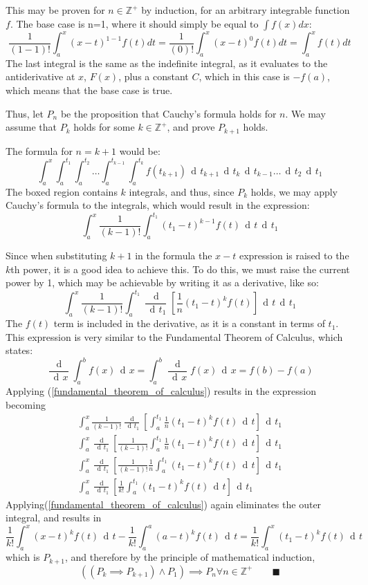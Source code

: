 \documentclass{article}
\DeclareMathOperator{\di}{\,d\!}
\begin{document}
This may be proven for $n \in \mathbb{Z}^+$ by induction, for an arbitrary
integrable function $f$. The base case is n=1, where it should simply be equal
to
$\int
f\left(x\right)dx$:
$$
\frac{1}{(1-1)!}\int_a^x\left(x-t\right)^{1-1}f\left(t\right)dt =
\frac{1}{(0)!}\int_a^x\left(x-t\right)^{0}f\left(t\right)dt =
\int_a^xf\left(t\right)dt
$$
The last integral is the same as the indefinite integral, as it evaluates to
the antiderivative at $x$, $F(x)$, plus a constant $C$, which in this case is
$-f(a)$, which means that the base case is true.

Thus, let $P_n$ be the proposition that Cauchy's formula holds for $n$. We may
assume that $P_k$ holds for some $k \in \mathbb{Z}^+$, and prove $P_{k+1}$
holds.

The formula for $n = k + 1$ would be:
$$
\int_a^x
\boxed{
\int_a^{t_1}
\int_a^{t_2}
\ldots
\int_a^{t_{k-1}}
\int_a^{t_k}f\left(t_{k+1}\right) \di t_{k+1}\di t_k\di t_{k-1} \ldots \di t_2}\di t_1
$$
The boxed region contains $k$ integrals, and thus, since $P_k$ holds, we may apply
Cauchy's formula to the integrals, which would result in the expression:
$$
\int_a^x
\frac{1}{(k-1)!}\int_a^{t_1}\left(t_1-t\right)^{k-1}f\left(t\right)\di t\di t_1
$$

Since when substituting $k+1$ in the formula the $x-t$ expression is raised to
the $k$th power, it is a good idea to achieve this. To do this, we must raise
the current power by 1, which may be achievable by writing it as a derivative,
like so:
$$
\int_a^x
\frac{1}{(k-1)!}\int_a^{t_1}\frac{\di}{\di t_1}\left[\frac{1}{n}\left(t_1-t\right)^k f\left(t\right)\right]\di t\di t_1
$$
The $f(t)$ term is included in the derivative, as it is a constant in terms of
$t_1$. This expression is very similar to the Fundamental Theorem of Calculus,
which states:
\begin{equation}
	\label{fundamental_theorem_of_calculus}
\frac{\di}{\di x}\int_a^bf(x)\di x = \int_a^b\frac{\di}{\di x}f(x) \di x = f(b)- f(a)
\end{equation}
Applying (\ref{fundamental_theorem_of_calculus}) results in the expression becoming
\begin{gather*}
\int_a^x
\frac{1}{(k-1)!}\frac{\di}{\di t_1}\left[\int_a^{t_1}\frac{1}{n}\left(t_1-t\right)^k f(t)\di t\right]\di t_1 \\
\int_a^x
\frac{\di}{\di t_1}\left[\frac{1}{(k-1)!}\int_a^{t_1}\frac{1}{n}\left(t_1-t\right)^k f(t)\di t\right]\di t_1 \\
\int_a^x
\frac{\di}{\di t_1}\left[\frac{1}{(k-1)!}\frac{1}{n}\int_a^{t_1}\left(t_1-t\right)^k f(t)\di t\right]\di t_1 \\
\int_a^x
\frac{\di}{\di t_1}\left[\frac{1}{k!}\int_a^{t_1}\left(t_1-t\right)^k f(t)\di t\right]\di t_1
\end{gather*}
Applying(\ref{fundamental_theorem_of_calculus}) again eliminates the outer integral,
and results in
$$
\frac{1}{k!}\int_a^x\left(x-t\right)^k f(t)\di t -
\frac{1}{k!}\int_a^a\left(a-t\right)^k f(t)\di t =
\frac{1}{k!}\int_a^x\left(t_1-t\right)^k f(t)\di t
$$
which is $P_{k+1}$, and therefore by the principle of mathematical induction,
$$
\left(\left(P_k \implies P_{k+1}\right) \land P_1\right)
\implies P_n \forall n \in \mathbb{Z}^+
\qquad \blacksquare
$$
\end{document}
